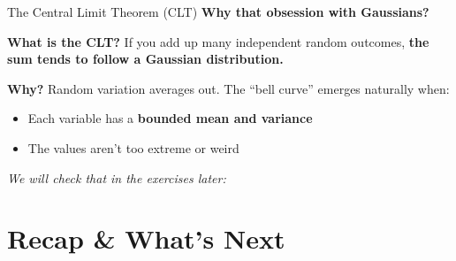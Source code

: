 \documentclass{beamer}
\begin{document}
\begin{frame}{The Central Limit Theorem (CLT)}
  \textbf{Why that obsession with Gaussians?}
  \vspace{0.5em}

\textbf{What is the CLT?}
\vspace{0.5em}
If you add up many independent random outcomes,
\textbf{the sum tends to follow a Gaussian distribution.}

\vspace{1em}
\textbf{Why?} Random variation averages out. The “bell curve” emerges naturally when:
\begin{itemize}
  \item Each variable has a \textbf{bounded mean and variance}
  \item The values aren’t too extreme or weird
\end{itemize}


\vspace{0.5em}
\textit{We will check that in the exercises later:}
\end{frame}

\section{Recap \& What’s Next}
\end{document}
